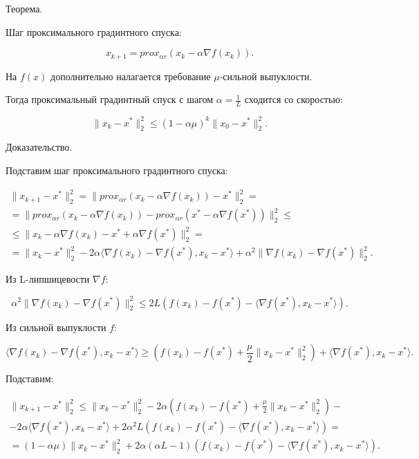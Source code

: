 Теорема.

Шаг проксимального градинтного спуска:

\begin{equation}
    x_{k+1}=prox_{\alpha r}(x_k-\alpha\nabla f(x_k)).
\end{equation}

На $f(x)$ дополнительно налагается требование $\mu$-сильной выпуклости.

Тогда проксимальный градинтный спуск с шагом $\alpha=\frac1L$ сходится со скоростью:

\begin{equation}
    \|x_k-x^*\|_2^2\leq(1-\alpha\mu)^k\|x_0-x^*\|_2^2.
\end{equation}

Доказательство.

Подставим шаг проксимального градинтного спуска:

\begin{equation}
\begin{aligned}
    \|x_{k+1}-x^*\|_2^2=
    \|prox_{\alpha r}(x_k-\alpha\nabla f(x_k))-x^*\|_2^2=\\=
    \|prox_{\alpha r}(x_k-\alpha\nabla f(x_k))-
    prox_{\alpha r}(x^*-\alpha\nabla f(x^*))\|_2^2\leq\\\leq
    \|x_k-\alpha\nabla f(x_k)-x^*+\alpha\nabla f(x^*)\|_2^2=\\=
    \|x_k-x^*\|_2^2-
    2\alpha\langle\nabla f(x_k)-\nabla f(x^*),x_k-x^*\rangle+
    \alpha^2\|\nabla f(x_k)-\nabla f(x^*)\|_2^2.
\end{aligned}
\end{equation}

Из L-липшицевости $\nabla f$:

\begin{equation}
    \alpha^2\|\nabla f(x_k)-\nabla f(x^*)\|_2^2\leq
    2L\left(f(x_k)-f(x^*)-\langle\nabla f(x^*),x_k-x^*\rangle\right).
\end{equation}

Из сильной выпуклости $f$:

\begin{equation}
    \langle\nabla f(x_k)-\nabla f(x^*),x_k-x^*\rangle\geq
    \left(f(x_k)-f(x^*)+\frac\mu2\|x_k-x^*\|_2^2\right)+\langle\nabla f(x^*),x_k-x^*\rangle.
\end{equation}

Подставим:

\begin{equation}
\begin{aligned}
    \|x_{k+1}-x^*\|_2^2\leq
    \|x_k-x^*\|_2^2-
    2\alpha\left(f(x_k)-f(x^*)+\frac\mu2\|x_k-x^*\|_2^2\right)-\\-
    2\alpha\langle\nabla f(x^*),x_k-x^*\rangle+
    2\alpha^2 L\left(f(x_k)-f(x^*)-\langle\nabla f(x^*),x_k-x^*\rangle\right)=\\=
    (1-\alpha\mu)\|x_k-x^*\|_2^2+
    2\alpha(\alpha L-1)\left(f(x_k)-f(x^*)-\langle\nabla f(x^*),x_k-x^*\rangle\right).
\end{aligned}
\end{equation}

